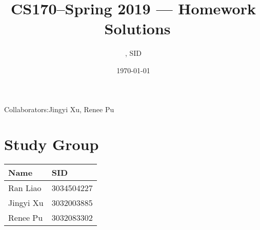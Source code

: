 \documentclass[11pt]{article}
\title{CS170--Spring 2019 --- Homework \Homework\ Solutions}
\author{\Name, SID \SID}
\date{\today}
\begin{document}
\maketitle
Collaborators:Jingyi Xu, Renee Pu

\section{Study Group}
	\begin{tabular}{ll}
		Name		&   SID         		\\\hline
		Ran Liao		&   3034504227  	\\  
		Jingyi Xu		&   3032003885  	\\
		Renee Pu		&   3032083302  	\\
	\end{tabular}

	
\newpage
\end{document}
